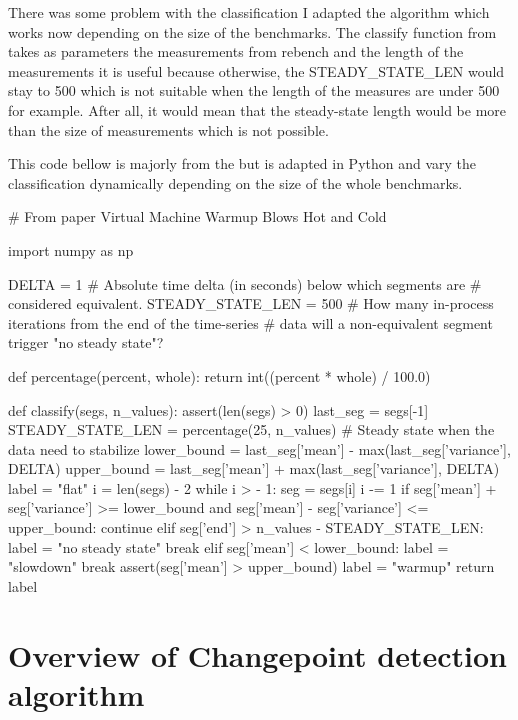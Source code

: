 \documentclass{article}
\begin{document}
There was some problem with the classification I adapted the algorithm which works now depending on the size of the benchmarks.
The classify function from \cite{barrett2017virtual} takes as parameters the measurements from rebench and the length of the measurements it is useful because otherwise, the STEADY\_STATE\_LEN would stay to 500 which is not suitable when the length of the measures are under 500 for example. After all, it would mean that the steady-state length would be more than the size of measurements which is not possible.

This code bellow is majorly from the \cite{barrett2017virtual} but is adapted in Python and vary the classification dynamically depending on the size of the whole benchmarks.
\begin{python}[h!]

# From paper Virtual Machine Warmup Blows Hot and Cold

import numpy as np


DELTA = 1  # Absolute time delta (in seconds) below which segments are
# considered equivalent.
STEADY_STATE_LEN = 500  # How many in-process iterations from the end of the time-series
# data will a non-equivalent segment trigger "no steady state"?


def percentage(percent, whole):
    return int((percent * whole) / 100.0)


def classify(segs, n_values):
    assert(len(segs) > 0)
    last_seg = segs[-1]
    STEADY_STATE_LEN = percentage(25, n_values) # Steady state when the data need to stabilize
    lower_bound = last_seg['mean'] - max(last_seg['variance'], DELTA)
    upper_bound = last_seg['mean'] + max(last_seg['variance'], DELTA)
    label = "flat"
    i = len(segs) - 2
    while i > - 1:
        seg = segs[i]
        i -= 1
        if seg['mean'] + seg['variance'] >= lower_bound and seg['mean'] - seg['variance'] <= upper_bound:
            continue
        elif seg['end'] > n_values - STEADY_STATE_LEN:
            label = "no steady state"
            break
        elif seg['mean'] < lower_bound:
            label = "slowdown"
            break
        assert(seg['mean'] > upper_bound)
        label = "warmup"
    return label
\end{python}





\section{Overview of Changepoint detection algorithm}
\end{document}
